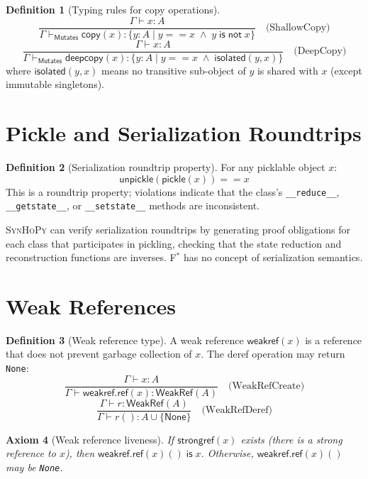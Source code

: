 \documentclass[11pt,a4paper]{report}
\theoremstyle{definition}
\newtheorem{definition}{Definition}[chapter]
\theoremstyle{plain}
\newtheorem{axiom_env}[definition]{Axiom}
\newcommand{\Mutates}{\mathsf{Mutates}}
\newcommand{\fstar}{F$^{*}$}
\newcommand{\synhopy}{\textsc{SynHoPy}}
\begin{document}
\begin{definition}[Typing rules for copy operations]
\[
  \frac{
    \Gamma \vdash x : A
  }{
    \Gamma \vdash_{\Mutates} \mathsf{copy}(x) : \{ y : A \mid y == x \;\land\; y\;\mathsf{is\;not}\;x \}
  } \quad \text{(ShallowCopy)}
\]
\[
  \frac{
    \Gamma \vdash x : A
  }{
    \Gamma \vdash_{\Mutates} \mathsf{deepcopy}(x) : \{ y : A \mid y == x \;\land\; \mathsf{isolated}(y, x) \}
  } \quad \text{(DeepCopy)}
\]
where $\mathsf{isolated}(y, x)$ means no transitive sub-object of $y$ is shared with $x$
(except immutable singletons).
\end{definition}


\section{Pickle and Serialization Roundtrips}

\begin{definition}[Serialization roundtrip property]
For any picklable object $x$:
\[
  \mathsf{unpickle}(\mathsf{pickle}(x)) == x
\]
This is a roundtrip property; violations indicate that the class's
\lstinline[style=python]{__reduce__}, \lstinline[style=python]{__getstate__}, or
\lstinline[style=python]{__setstate__} methods are inconsistent.
\end{definition}

\synhopy{} can verify serialization roundtrips by generating proof obligations
for each class that participates in pickling, checking that the state reduction
and reconstruction functions are inverses.  \fstar{} has no concept of
serialization semantics.


\section{Weak References}

\begin{definition}[Weak reference type]
A weak reference $\mathsf{weakref}(x)$ is a reference that does not prevent
garbage collection of $x$.  The deref operation may return \lstinline[style=python]{None}:
\[
  \frac{
    \Gamma \vdash x : A
  }{
    \Gamma \vdash \mathsf{weakref.ref}(x) : \mathsf{WeakRef}(A)
  } \quad \text{(WeakRefCreate)}
\]
\[
  \frac{
    \Gamma \vdash r : \mathsf{WeakRef}(A)
  }{
    \Gamma \vdash r() : A \cup \{\mathsf{None}\}
  } \quad \text{(WeakRefDeref)}
\]
\end{definition}

\begin{axiom_env}[Weak reference liveness]
If $\mathsf{strongref}(x)$ exists (there is a strong reference to $x$), then
$\mathsf{weakref.ref}(x)() \;\mathsf{is}\; x$.  Otherwise, $\mathsf{weakref.ref}(x)()$ may be
\lstinline[style=python]{None}.
\end{axiom_env}
\end{document}
